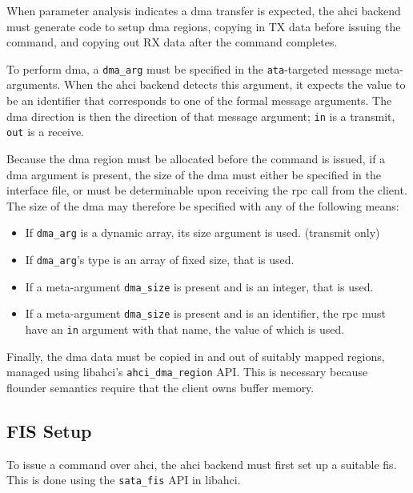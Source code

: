 When parameter analysis indicates a \acs{dma} transfer is expected, the
\ac{ahci} backend must generate code to setup \acs{dma} regions, copying in TX
data before issuing the command, and copying out RX data after the command
completes.

To perform \acs{dma}, a \lstinline+dma_arg+ must be specified in the
\lstinline+ata+-targeted message meta-arguments. When the \ac{ahci} backend
detects this argument, it expects the value to be an identifier that
corresponds to one of the formal message arguments. The \acs{dma} direction is
then the direction of that message argument; \lstinline+in+ is a transmit,
\lstinline+out+ is a receive.

Because the \acs{dma} region must be allocated before the command is issued, if
a \acs{dma} argument is present, the size of the \acs{dma} must either be
specified in the interface file, or must be determinable upon receiving the rpc
call from the client. The size of the \acs{dma} may therefore be specified with
any of the following means:

\begin{itemize}
	\item If \lstinline+dma_arg+ is a dynamic array, its size argument is used.
		(transmit only)
	\item If \lstinline+dma_arg+'s type is an array of fixed size, that is
		used.
	\item If a meta-argument \lstinline+dma_size+ is present and is an integer,
		that is used.
	\item If a meta-argument \lstinline+dma_size+ is present and is an
		identifier, the \acs{rpc} must have an \lstinline+in+ argument with
		that name, the value of which is used.
\end{itemize}

Finally, the \acs{dma} data must be copied in and out of suitably mapped
regions, managed using libahci's \lstinline+ahci_dma_region+ API. This is
necessary because flounder semantics require that the client owns buffer
memory.

\subsection{FIS Setup}

To issue a command over \ac{ahci}, the \acs{ahci} backend must first set up a
suitable \ac{fis}.  This is done using the \lstinline+sata_fis+ API in libahci.
